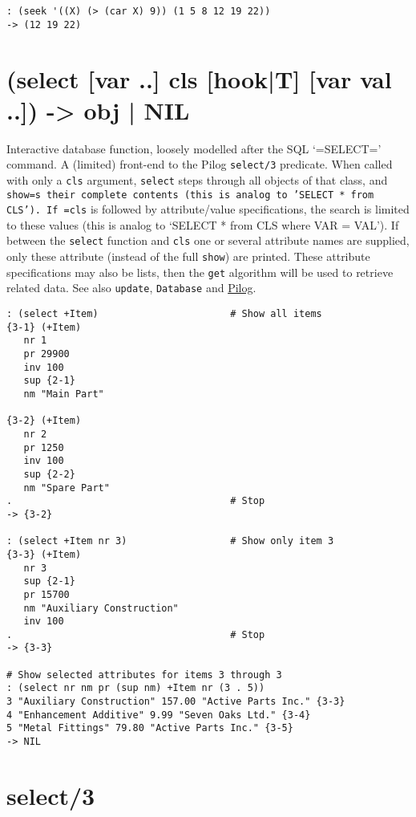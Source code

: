 {{{{{{{{\begin{verbatim}
: (seek '((X) (> (car X) 9)) (1 5 8 12 19 22))
-> (12 19 22)
\end{verbatim}

 
\section{(select [var ..] cls [hook|T] [var val ..]) -> obj | NIL}
\label{sec-8-1-19-14}


Interactive database function, loosely modelled after the SQL `=SELECT='
command. A (limited) front-end to the Pilog \texttt{select/3} predicate. When
called with only a \texttt{cls} argument, \texttt{select} steps through all objects of
that class, and \texttt{show=s their complete contents (this is analog to 'SELECT * from CLS'). If =cls} is followed by attribute/value
specifications, the search is limited to these values (this is analog to
`SELECT * from CLS where VAR = VAL'). If between the \texttt{select} function
and \texttt{cls} one or several attribute names are supplied, only these
attribute (instead of the full \texttt{show}) are printed. These attribute
specifications may also be lists, then the \texttt{get} algorithm will be used
to retrieve related data. See also \texttt{update}, \texttt{Database} and
\hyperref[ref.html-pilog]{Pilog}.


\begin{verbatim}
: (select +Item)                       # Show all items
{3-1} (+Item)
   nr 1
   pr 29900
   inv 100
   sup {2-1}
   nm "Main Part"

{3-2} (+Item)
   nr 2
   pr 1250
   inv 100
   sup {2-2}
   nm "Spare Part"
.                                      # Stop
-> {3-2}

: (select +Item nr 3)                  # Show only item 3
{3-3} (+Item)
   nr 3
   sup {2-1}
   pr 15700
   nm "Auxiliary Construction"
   inv 100
.                                      # Stop
-> {3-3}

# Show selected attributes for items 3 through 3
: (select nr nm pr (sup nm) +Item nr (3 . 5))
3 "Auxiliary Construction" 157.00 "Active Parts Inc." {3-3}
4 "Enhancement Additive" 9.99 "Seven Oaks Ltd." {3-4}
5 "Metal Fittings" 79.80 "Active Parts Inc." {3-5}
-> NIL
\end{verbatim}

 
\section{select/3}
\label{sec-8-1-19-15}


}}}}}}}}
